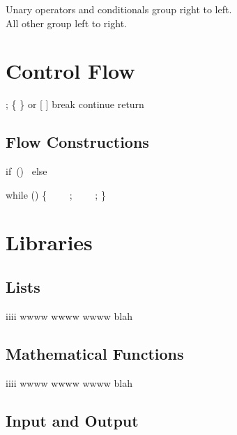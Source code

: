 \documentclass{refcard}
\begin{document}
\noindent
Unary operators and conditionals group right to left.\\
All other group left to right.


\section{Control Flow}

\begin{ldesc}
	        ;
	             \{ \} or [ ]
	             break
	        continue
	  return 
\end{ldesc}


\subsection{Flow Constructions}

\begin{ldesc}
	\li[if statement]
		if~()~ \li
		else~~~~~      \li

		while () \{ \li
		~~~~;  \li
		~~~~;  \li
	    \}
\end{ldesc}


\section{Libraries}


\subsection{Lists \hfill {}}

\begin{ldesc}
	\li[iiii] iiii
	\li[wwww] wwww
	\li[iiii] wwww
	\li       wwww
	\li[blah] blah
\end{ldesc}

\subsection{Mathematical Functions \hfill {}}

\begin{ldesc}
	\li[iiii] iiii
	\li[wwww] wwww
	\li[iiii] wwww
	\li       wwww
	\li[blah] blah
\end{ldesc}


\subsection{Input and Output \hfill {}}
\end{document}
